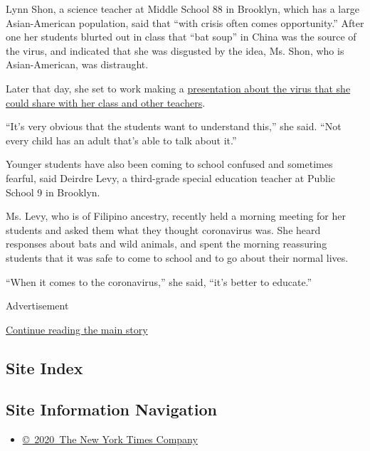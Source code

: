 Lynn Shon, a science teacher at Middle School 88 in Brooklyn, which has
a large Asian-American population, said that ``with crisis often comes
opportunity.'' After one her students blurted out in class that ``bat
soup'' in China was the source of the virus, and indicated that she was
disgusted by the idea, Ms. Shon, who is Asian-American, was distraught.

Later that day, she set to work making a
\href{https://docs.google.com/presentation/d/1HGQ3_xUlLwSstRVsn9XvQzfs9ucib55yf6IrheZhQaM/edit\#slide=id.g70fd9b34e6_0_198}{presentation
about the virus that she could share with her class and other teachers}.

``It's very obvious that the students want to understand this,'' she
said. ``Not every child has an adult that's able to talk about it.''

Younger students have also been coming to school confused and sometimes
fearful, said Deirdre Levy, a third-grade special education teacher at
Public School 9 in Brooklyn.

Ms. Levy, who is of Filipino ancestry, recently held a morning meeting
for her students and asked them what they thought coronavirus was. She
heard responses about bats and wild animals, and spent the morning
reassuring students that it was safe to come to school and to go about
their normal lives.

``When it comes to the coronavirus,'' she said, ``it's better to
educate.''

Advertisement

\protect\hyperlink{after-bottom}{Continue reading the main story}

\hypertarget{site-index}{%
\subsection{Site Index}\label{site-index}}

\hypertarget{site-information-navigation}{%
\subsection{Site Information
Navigation}\label{site-information-navigation}}

\begin{itemize}
\tightlist
\item
  \href{https://help.nytimes3xbfgragh.onion/hc/en-us/articles/115014792127-Copyright-notice}{©~2020~The
  New York Times Company}
\end{itemize}

